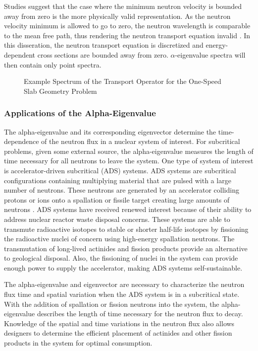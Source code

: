 Studies suggest that the case where the minimum neutron velocity is bounded away from zero is the more physically valid representation. As the neutron velocity minimum is allowed to go to zero, the neutron wavelength is comparable to the mean free path, thus rendering the neutron transport equation invalid \cite{duderstadt_nuclear_1976}. In this disseration, the neutron transport equation is discretized and energy-dependent cross sections are bounded away from zero. $\alpha$-eigenvalue spectra will then contain only point spectra.

\begin{figure}
	\centering
	\resizebox{0.5\textwidth}{!}{

	}
	\caption{Example Spectrum of the Transport Operator for the One-Speed Slab Geometry Problem}
	\label{fig:AlphaEigSpectrum}
\end{figure}

\subsubsection{Applications of the Alpha-Eigenvalue}

The alpha-eigenvalue and its corresponding eigenvector determine the time-dependence of the neutron flux in a nuclear system of interest. For subcritical problems, given some external source, the alpha-eigenvalue measures the length of time necessary for all neutrons to leave the system. One type of system of interest is accelerator-driven subcritical (ADS) systems. ADS systems are subcritical configurations containing multiplying material that are pulsed with a large number of neutrons. These neutrons are generated by an accelerator colliding protons or ions onto a spallation or fissile target creating large amounts of neutrons \cite{abderrahim2001myrrha}. ADS systems have received renewed interest because of their ability to address nuclear reactor waste disposal concerns. These systems are able to transmute radioactive isotopes to stable or shorter half-life isotopes by fissioning the radioactive nuclei of concern using high-energy spallation neutrons. The transmutation of long-lived actinides and fission products provide an alternative to geological disposal. Also, the fissioning of nuclei in the system can provide enough power to supply the accelerator, making ADS systems self-sustainable.

The alpha-eigenvalue and eigenvector are necessary to characterize the neutron flux time and spatial variation when the ADS system is in a subcritical state. With the addition of spallation or fission neutrons into the system, the alpha-eigenvalue describes the length of time necessary for the neutron flux to decay. Knowledge of the spatial and time variations in the neutron flux also allows designers to determine the efficient placement of actinides and other fission products in the system for optimal consumption.

